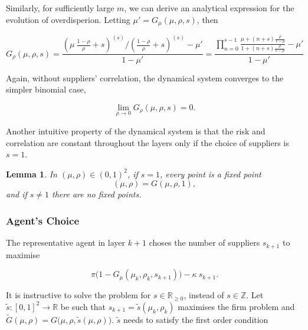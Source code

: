 \documentclass[american, abstract=on]{scrartcl}
\theoremstyle{plain}
\newtheorem{lemma}{Lemma}
\renewcommand{\Re}{\mathbb{R}}
\begin{document}
Similarly, for sufficiently large $m$, we can derive an analytical expression for the evolution of overdisperion. Letting $\mu' = G_\mu(\mu, \rho, s)$, then

\begin{equation}
  G_\rho(\mu, \rho, s) = \frac{\left( \mu \  \frac{1 - \rho}{\rho} + s \right)^{(s)} \Big/ \left( \frac{1 - \rho}{\rho} + s \right)^{(s)} - \mu'}{1 - \mu'} = \frac{\prod^{s - 1}_{n = 0} \frac{\mu + (n + s) \frac{\rho}{1 - \rho}}{1 + (n + s) \frac{\rho}{1 - \rho}} - \mu'}{1 - \mu'}
\end{equation}



Again, without suppliers' correlation, the dynamical system converges to the simpler binomial case,

\begin{equation}
  \lim_{\rho \rightarrow 0} G_\rho(\mu, \rho, s) = 0.
\end{equation}

Another intuitive property of the dynamical system is that the risk and correlation are constant throughout the layers only if the choice of suppliers is $s = 1$. 

\begin{lemma}
  In $(\mu, \rho) \in (0, 1)^2$, if $s = 1$, every point is a fixed point \begin{equation}
    (\mu, \rho) = G(\mu, \rho, 1),  
  \end{equation} and if $s \neq 1$ there are no fixed points.
\end{lemma}

\subsubsection{Agent's Choice}

The representative agent in layer $k + 1$ choses the number of suppliers $s_{k+1}$ to maximise

\begin{equation}
  \pi \Big(1 - G_{\mu}(\mu_k, \rho_k, s_{k+1})\Big) - \kappa \  s_{k + 1}.
\end{equation}

It is instructive to solve the problem for $s \in \Re_{\geq 0}$, instead of $s \in \mathbb{Z}$. Let $\tilde{s}: [0, 1]^2 \to \Re$ be such that $s_{k + 1} = \tilde{s}(\mu_k, \rho_k)$ maximises the firm problem and $\tilde{G}(\mu, \rho) = G\big(\mu, \rho, \tilde{s}(\mu, \rho)\big)$. $\tilde{s}$ needs to satisfy the first order condition
\end{document}
